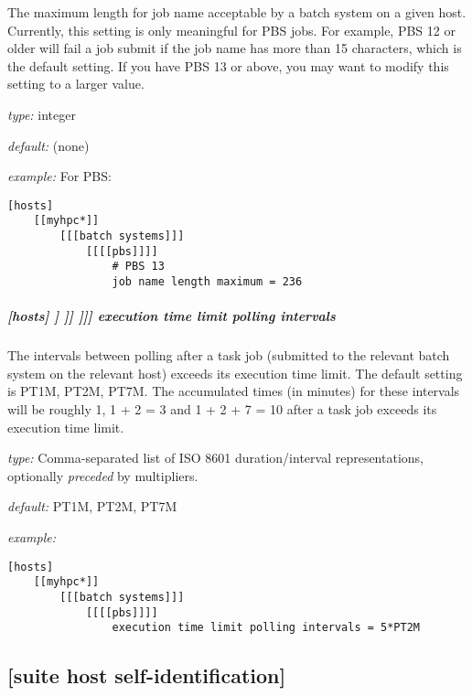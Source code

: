 The maximum length for job name acceptable by a batch system on a given host.
Currently, this setting is only meaningful for PBS jobs. For example, PBS 12
or older will fail a job submit if the job name has more than 15 characters,
which is the default setting. If you have PBS 13 or above, you may want to
modify this setting to a larger value.

\begin{myitemize}
\item {\em type:} integer
\item {\em default:} (none)
\item {\em example:}  For PBS:
    \begin{lstlisting}
[hosts]
    [[myhpc*]]
        [[[batch systems]]]
            [[[[pbs]]]]
                # PBS 13
                job name length maximum = 236
    \end{lstlisting}
\end{myitemize}

\subparagraph[{[[[[}SYSTEM{]]]]}execution time limit polling intervals]{[hosts] \textrightarrow [[HOST]] \textrightarrow [[[batch systems]]] \textrightarrow [[[[SYSTEM]]]] \textrightarrow execution time limit polling intervals}
\label{ExecutionTimeLimitPollingIntervals}

The intervals between polling after a task job (submitted to the relevant batch
system on the relevant host) exceeds its execution time limit. The default
setting is PT1M, PT2M, PT7M. The accumulated times (in minutes) for these
intervals will be roughly 1, 1 + 2 = 3 and 1 + 2 + 7 = 10 after a task job
exceeds its execution time limit.

\begin{myitemize}
    \item {\em type:} Comma-separated list of ISO 8601 duration/interval
        representations, optionally {\em preceded} by multipliers.
    \item {\em default:} PT1M, PT2M, PT7M
    \item {\em example:}
    \begin{lstlisting}
[hosts]
    [[myhpc*]]
        [[[batch systems]]]
            [[[[pbs]]]]
                execution time limit polling intervals = 5*PT2M
    \end{lstlisting}
\end{myitemize}

\subsection{[suite host self-identification] }

